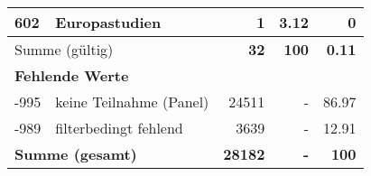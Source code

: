 \begin{longtable}{lXrrr}
     602 &
     \multicolumn{1}{X}{ Europastudien   } &


       \num{1} &
       \num[round-mode=places,round-precision=2]{3,12} &
         \num[round-mode=places,round-precision=2]{0} \\
     \midrule
     \multicolumn{2}{l}{Summe (gültig)} &
       \textbf{\num{32}} &
     \textbf{100} &
       \textbf{\num[round-mode=places,round-precision=2]{0,11}} \\
     \multicolumn{5}{l}{\textbf{Fehlende Werte}}\\
       -995 &
       keine Teilnahme (Panel) &
         \num{24511} &
        - &
         \num[round-mode=places,round-precision=2]{86,97} \\
       -989 &
       filterbedingt fehlend &
         \num{3639} &
        - &
         \num[round-mode=places,round-precision=2]{12,91} \\
     \midrule
     \multicolumn{2}{l}{\textbf{Summe (gesamt)}} &
          \textbf{\num{28182}} &
        \textbf{-} &
        \textbf{100} \\
     \bottomrule
     \end{longtable}
     
